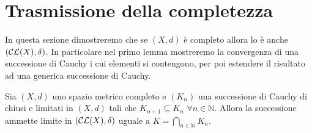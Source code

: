 \section{Trasmissione della completezza}
In questa sezione dimostreremo che se $(X,d)$ è completo allora lo è anche $(\mathcal{CL}(X),\delta) $.
In particolare nel primo lemma mostreremo la convergenza di una successione di Cauchy i cui elementi si contengono, per poi estendere il risultato ad una generica successione di Cauchy.

\begin{lemma} \label {inglobati}
Sia $\left (X,d\right )$ uno spazio metrico completo e $\left (K_n \right )$ una successione di Cauchy di chiusi e limitati in $\left (X,d\right )$ tali che $K_{n+1}\subseteq K_n$ $ \forall n \in \mathbb{N}$. Allora la successione ammette limite in $\left (\mathcal{CL} (X),\delta\right  ) $ uguale a $ K=\bigcap_{n \in \mathbb{N}}K_n $.
\end{lemma}
